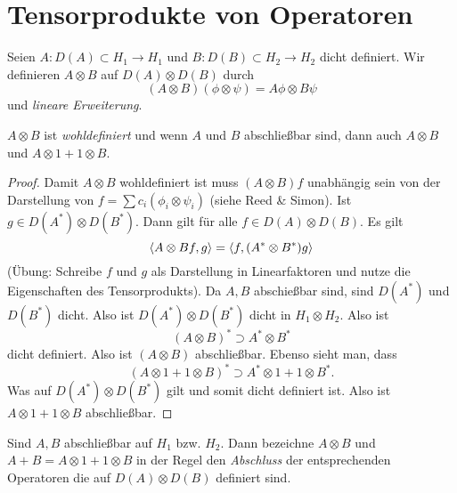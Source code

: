 \documentclass{mycourse}
\begin{document}
\section{Tensorprodukte von Operatoren}
Seien $A: D(A)\subset H_1\to H_1$ und $B: D(B) \subset H_2 \to H_2$ dicht definiert. Wir definieren $A\otimes B$ auf $D(A) \otimes D(B)$ durch
\[
(A\otimes B) (\phi \otimes \psi) = A\phi \otimes B\psi
\]
und \emph{lineare Erweiterung}.
\begin{lem}
$A\otimes B$ ist \emph{wohldefiniert} und wenn $A$ und $B$ abschließbar sind, dann auch $A\otimes B$ und $A\otimes 1 + 1 \otimes B$.
\end{lem}
\begin{proof}
Damit $A\otimes B$ wohldefiniert ist muss $(A\otimes B) f$ unabhängig sein von der Darstellung von $f= \sum c_i (\phi_i \otimes \psi_i)$ (siehe Reed \& Simon). Ist $g\in D(A^*)\otimes D(B^*)$. Dann gilt für alle $f\in D(A) \otimes D(B)$. Es gilt
\[
\langle A\otimes B f, g\rangle = \langle f, (A^* \otimes B^*)g\rangle
\]
(Übung: Schreibe $f$ und $g$ als Darstellung in Linearfaktoren und nutze die Eigenschaften des Tensorprodukts\fixme[?]). Da $A,B$ abschießbar sind, sind $D(A^*)$ und $D(B^*)$ dicht. Also ist $D(A^*) \otimes D(B^*)$ dicht in $H_1 \otimes H_2$. Also ist
\[
(A\otimes B)^* \supset A^* \otimes B^*
\]  
dicht definiert. Also ist $(A\otimes B)$ abschließbar. Ebenso sieht man, dass
\[
(A\otimes 1+ 1 \otimes B)^* \supset A^* \otimes 1 + 1 \otimes B^*.
\]
Was auf $D(A^*) \otimes D(B^*)$ gilt und somit dicht definiert ist. Also ist $A\otimes 1 + 1\otimes B$ abschließbar.
\end{proof}

Sind $A,B$ abschließbar auf $H_1$ bzw. $H_2$. Dann bezeichne $A\otimes B$ und $A+B = A\otimes 1 + 1 \otimes B$ in der Regel den \emph{Abschluss} der entsprechenden Operatoren die auf $D(A) \otimes D(B)$ definiert sind. 
\end{document}
